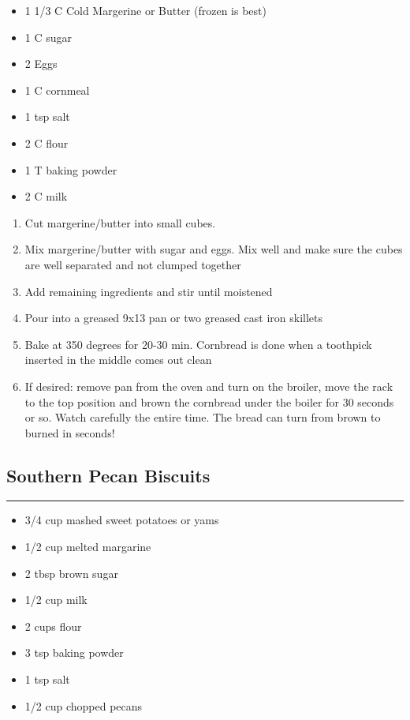 \documentclass{article}
\begin{document}
\begin{framed}
    \begin{itemize}
        \item 1 1/3 C Cold Margerine or Butter (frozen is best)
        \item 1 C sugar
        \item 2 Eggs
        \item 1 C cornmeal
        \item 1 tsp salt
        \item 2 C flour
        \item 1 T baking powder
        \item 2 C milk
    \end{itemize}
\end{framed}


\begin{enumerate}
    \item 
        Cut margerine/butter into small cubes.
    \item 
        Mix margerine/butter with sugar and eggs. Mix well and make sure the cubes are well separated and not clumped together
    \item 
        Add remaining ingredients and stir until moistened
    \item 
        Pour into a greased 9x13 pan or two greased cast iron skillets
    \item 
        Bake at 350 degrees for 20-30 min. Cornbread is done when a toothpick inserted in the middle comes out clean
    \item 
        If desired: remove pan from the oven and turn on the broiler, move the rack to the top position and brown the cornbread under the boiler for 30 seconds or so.  Watch carefully the entire time.  The bread can turn from brown to burned in seconds!
\end{enumerate}
\newpage

\subsection{Southern Pecan Biscuits} 
\noindent\rule[0.5ex]{\linewidth}{1pt}

\begin{framed}
    \begin{itemize}
        \item 3/4 cup mashed sweet potatoes or yams
        \item 1/2 cup melted margarine
        \item 2 tbsp brown sugar
        \item 1/2 cup milk
        \item 2 cups flour
        \item 3 tsp baking powder
        \item 1 tsp salt
        \item 1/2 cup chopped pecans
    \end{itemize}
\end{framed}
\end{document}
